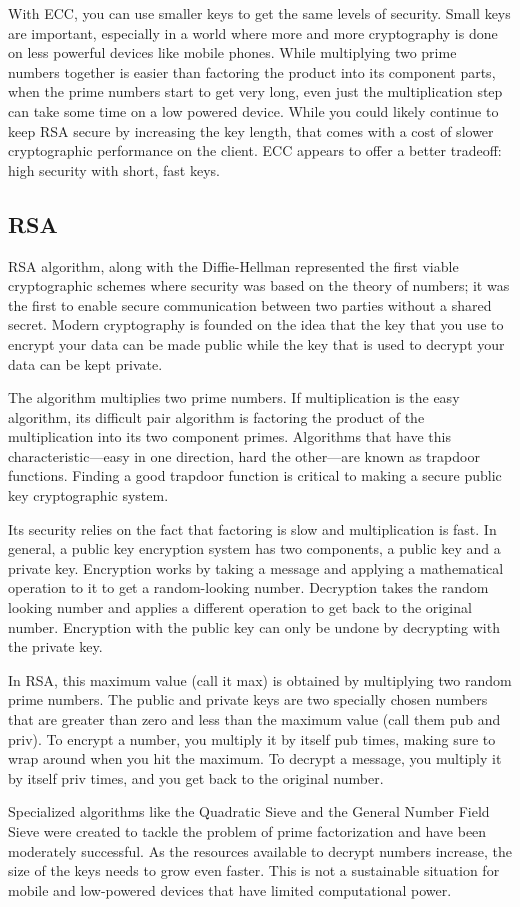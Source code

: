 With ECC, you can use smaller keys to get the same levels of security. Small keys are important, especially in a world where more and more cryptography is done on less powerful devices like mobile phones. While multiplying two prime numbers together is easier than factoring the product into its component parts, when the prime numbers start to get very long, even just the multiplication step can take some time on a low powered device. While you could likely continue to keep RSA secure by increasing the key length, that comes with a cost of slower cryptographic performance on the client. ECC appears to offer a better tradeoff: high security with short, fast keys.

\subsection{RSA}
RSA algorithm, along with the Diffie-Hellman represented the first viable cryptographic schemes where security was based on the theory of numbers; it was the first to enable secure communication between two parties without a shared secret.
Modern cryptography is founded on the idea that the key that you use to encrypt your data can be made public while the key that is used to decrypt your data can be kept private.

The algorithm multiplies two prime numbers. If multiplication is the easy algorithm, its difficult pair algorithm is factoring the product of the multiplication into its two component primes. Algorithms that have this characteristic—easy in one direction, hard the other—are known as trapdoor functions. Finding a good trapdoor function is critical to making a secure public key cryptographic system.

Its security relies on the fact that factoring is slow and multiplication is fast. In general, a public key encryption system has two components, a public key and a private key. Encryption works by taking a message and applying a mathematical operation to it to get a random-looking number. Decryption takes the random looking number and applies a different operation to get back to the original number. Encryption with the public key can only be undone by decrypting with the private key.

In RSA, this maximum value (call it max) is obtained by multiplying two random prime numbers. The public and private keys are two specially chosen numbers that are greater than zero and less than the maximum value (call them pub and priv). To encrypt a number, you multiply it by itself pub times, making sure to wrap around when you hit the maximum. To decrypt a message, you multiply it by itself priv times, and you get back to the original number.

Specialized algorithms like the Quadratic Sieve and the General Number Field Sieve were created to tackle the problem of prime factorization and have been moderately successful. As the resources available to decrypt numbers increase, the size of the keys needs to grow even faster. This is not a sustainable situation for mobile and low-powered devices that have limited computational power.
